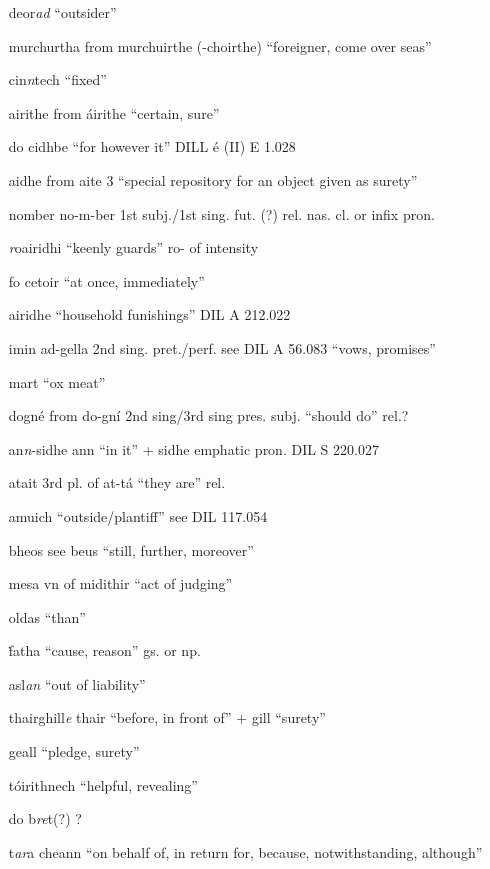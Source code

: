 \documentclass[11pt]{article}
\begin{document}
\begin{enumerate}
  \item[deor\emph{ad}] \enquote{outsider} 
  \item[murchurtha] from murchuirthe (-choirthe) \enquote{foreigner, come over seas} 
  \item[cin\emph{n}tech] \enquote{fixed}
  \item[airithe] from \'{a}irithe \enquote{certain, sure}
  \item[do cidhbe] \enquote{for however it} DILL \'{e} (II) E 1.028
  \item[aidhe] from aite 3 \enquote{special repository for an object given as surety}
  \item[nomber] no-m-ber 1st subj./1st sing. fut. (?) rel. nas. cl. or infix pron.
  \item[\emph{r}oairidhi] \enquote{keenly guards} ro- of intensity
  \item[fo cetoir] \enquote{at once, immediately} 
  \item[airidhe] \enquote{household funishings} DIL A 212.022
  \item[imin] ad-gella 2nd sing. pret./perf. see DIL A 56.083 \enquote{vows, promises}
  \item[mart] \enquote{ox meat}
  \item[dogn\'{e}] from do-gn\'{i} 2nd sing/3rd sing pres. subj. \enquote{should do} rel.?
  \item[an\emph{n}-sidhe] ann \enquote{in it} + sidhe emphatic pron. DIL S 220.027
  \item[atait] 3rd pl. of at-t\'{a} \enquote{they are} rel.
  \item[amuich] \enquote{outside/plantiff} see DIL 117.054
  \item[bheos] see beus \enquote{still, further, moreover} 
  \item[mesa] vn of midithir \enquote{act of judging}
  \item[oldas] \enquote{than}
  \item[\.{f}atha] \enquote{cause, reason} gs. or np.
  \item[asl\emph{an}] \enquote{out of liability}
  \item[thairghill\emph{e}]  thair \enquote{before, in front of} + gill \enquote{surety} 
  \item[geall] \enquote{pledge, surety}
  \item[t\'{o}irithnech] \enquote{helpful, revealing}
  \item[do b\emph{re}t(?)] ?
  \item[t\emph{ar}a cheann] \enquote{on behalf of, in return for, because, notwithstanding, although}

\end{enumerate}
\end{document}
